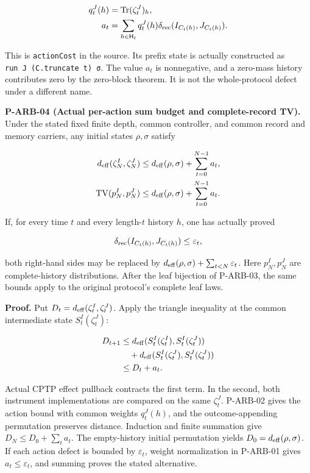 \documentclass[
  11pt,
  oneside]{book}
\begin{document}
\[
\begin{aligned}
q^J_t(h)&=\operatorname{Tr}(\zeta^J_t)_h,\\
a_t&=\sum_{h\in\mathsf H_t}q^J_t(h)
 \delta_{\rm rec}(I_{C_t(h)},J_{C_t(h)}).
\end{aligned}
\]

This is \texttt{action\allowbreak Cost} in the source. Its prefix state is actually
constructed as \texttt{run\ J\ (C.\allowbreak truncate\ t)\ σ}. The value \(a_t\) is
nonnegative, and a zero-mass history contributes zero by the zero-block
theorem. It is not the whole-protocol defect under a different name.

\label{p-arb-04}{}

\textbf{P-ARB-04 (Actual per-action sum budget and complete-record TV).}
Under the stated fixed finite depth, common controller, and common
record and memory carriers, any initial states \(\rho,\sigma\) satisfy

\[
\begin{aligned}
d_{\rm eff}(\zeta^I_N,\zeta^J_N)
&\le d_{\rm eff}(\rho,\sigma)+\sum_{t=0}^{N-1}a_t,\\
\operatorname{TV}(p^I_N,p^J_N)
&\le d_{\rm eff}(\rho,\sigma)+\sum_{t=0}^{N-1}a_t.
\end{aligned}
\]

If, for every time \(t\) and every length-\(t\) history \(h\), one has
actually proved

\[
\delta_{\rm rec}(I_{C_t(h)},J_{C_t(h)})\le\varepsilon_t,
\]

both right-hand sides may be replaced by
\(d_{\rm eff}(\rho,\sigma)+\sum_{t<N}\varepsilon_t\). Here
\(p^I_N,p^J_N\) are complete-history distributions. After the leaf
bijection of P-ARB-03, the same bounds apply to the original protocol's
complete leaf laws.

\textbf{Proof.} Put \(D_t=d_{\rm eff}(\zeta^I_t,\zeta^J_t)\). Apply the
triangle inequality at the common intermediate state
\(S^I_t(\zeta^J_t)\):

\[
\begin{aligned}
D_{t+1}
&\le d_{\rm eff}(S^I_t(\zeta^I_t),S^I_t(\zeta^J_t))\\
&\quad+d_{\rm eff}(S^I_t(\zeta^J_t),S^J_t(\zeta^J_t))\\
&\le D_t+a_t.
\end{aligned}
\]

Actual CPTP effect pullback contracts the first term. In the second,
both instrument implementations are compared on the same \(\zeta^J_t\).
P-ARB-02 gives the action bound with common weights \(q^J_t(h)\), and
the outcome-appending permutation preserves distance. Induction and
finite summation give \(D_N\le D_0+\sum_ta_t\). The empty-history
initial permutation yields \(D_0=d_{\rm eff}(\rho,\sigma)\). If each
action defect is bounded by \(\varepsilon_t\), weight normalization in
P-ARB-01 gives \(a_t\le\varepsilon_t\), and summing proves the stated
alternative.
\end{document}
